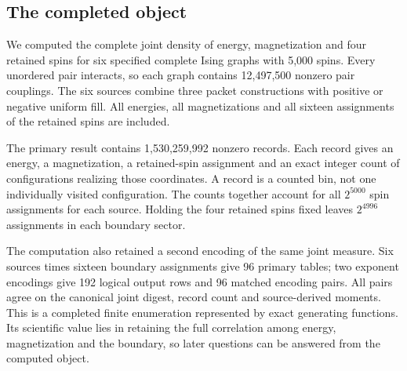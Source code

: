 \label{exact-joint-densities-at-n5000}

\subsection{The completed object}\label{the-completed-object}

We computed the complete joint density of energy, magnetization and four retained spins for six specified complete Ising graphs with 5,000 spins. Every unordered pair interacts, so each graph contains 12,497,500 nonzero pair couplings. The six sources combine three packet constructions with positive or negative uniform fill. All energies, all magnetizations and all sixteen assignments of the retained spins are included.

The primary result contains 1,530,259,992 nonzero records. Each record gives an energy, a magnetization, a retained-spin assignment and an exact integer count of configurations realizing those coordinates. A record is a counted bin, not one individually visited configuration. The counts together account for all \(2^{5000}\) spin assignments for each source. Holding the four retained spins fixed leaves \(2^{4996}\) assignments in each boundary sector.

The computation also retained a second encoding of the same joint measure. Six sources times sixteen boundary assignments give 96 primary tables; two exponent encodings give 192 logical output rows and 96 matched encoding pairs. All pairs agree on the canonical joint digest, record count and source-derived moments. This is a completed finite enumeration represented by exact generating functions. Its scientific value lies in retaining the full correlation among energy, magnetization and the boundary, so later questions can be answered from the computed object.

